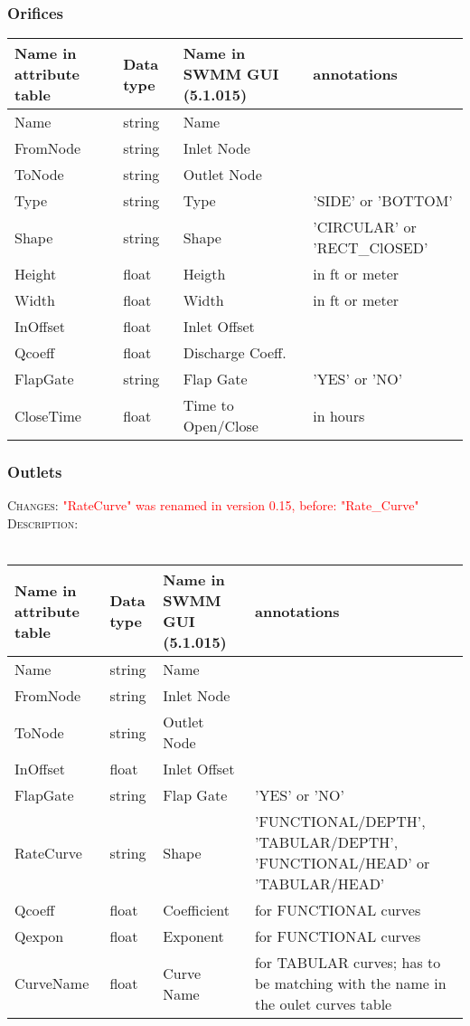 \documentclass[10pt,a4paper,oneside]{scrbook}
\begin{document}
\subsubsection{Orifices}
\begin{tabular}{p{1.7cm}|p{1.3cm}|P{3cm}|P{8cm}}
\hline 
\textbf{Name in attribute table} & \textbf{Data type} & \textbf{Name in SWMM GUI (5.1.015)} & \textbf{annotations}\\ 
\hline 
Name & string & Name & \\
FromNode & string & Inlet Node & \\ 
ToNode & string & Outlet Node&  \\ 
Type & string & Type & 'SIDE' or 'BOTTOM'\\
Shape & string & Shape & 'CIRCULAR' or 'RECT\_ClOSED'\\
Height & float & Heigth & in ft or meter\\
Width & float &  Width & in ft or meter \\
InOffset & float & Inlet Offset & \\
Qcoeff & float & Discharge Coeff. & \\
FlapGate & string & Flap Gate & 'YES' or 'NO'\\
CloseTime & float & Time to Open/Close  & in hours\\
\hline
\end{tabular}

\newpage
\subsubsection{Outlets}
\textsc{Changes}: \textcolor{red}{"RateCurve" was renamed in version 0.15, before: "Rate\_Curve"} \\
\textsc{Description}: \\
\\
\begin{tabular}{p{2cm}|p{1.3cm}|P{3cm}|P{7.7cm}}
\hline 
\textbf{Name in attribute table} & \textbf{Data type} & \textbf{Name in SWMM GUI (5.1.015)} & \textbf{annotations}\\ 
\hline 
Name & string & Name & \\
FromNode & string & Inlet Node & \\ 
ToNode & string & Outlet Node&  \\ 
InOffset & float & Inlet Offset & \\
FlapGate & string & Flap Gate & 'YES' or 'NO'\\
RateCurve & string & Shape & 'FUNCTIONAL/DEPTH', 'TABULAR/DEPTH', 'FUNCTIONAL/HEAD' or 'TABULAR/HEAD' \\
Qcoeff & float & Coefficient & for FUNCTIONAL curves\\
Qexpon & float & Exponent & for FUNCTIONAL curves\\
CurveName & float & Curve Name & for TABULAR curves; has to be matching with the name in the oulet curves table\\
\hline
\end{tabular}
\end{document}
